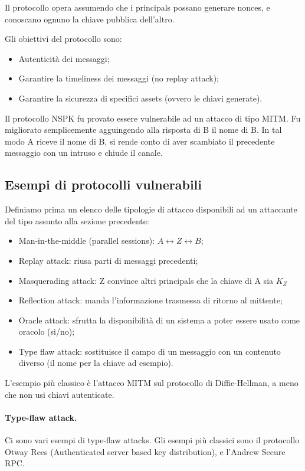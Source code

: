 \documentclass[a4paper, 10pt, twoside]{article}
\begin{document}
	Il protocollo opera assumendo che i principals possano generare nonces, e conoscano ognuno la chiave pubblica dell'altro.

	Gli obiettivi del protocollo sono:
	\begin{itemize}
		\item Autenticità dei messaggi;
		\item Garantire la timeliness dei messaggi (no replay attack);
		\item Garantire la sicurezza di specifici assets (ovvero le chiavi generate).
	\end{itemize}

	Il protocollo NSPK fu provato essere vulnerabile ad un attacco di tipo MITM. Fu migliorato semplicemente agguingendo alla risposta di B il nome di B. In tal modo A riceve il nome di B, si rende conto di aver scambiato il precedente messaggio con un intruso e chiude il canale.
	
	\subsection{Esempi di protocolli vulnerabili}
	Definiamo prima un elenco delle tipologie di attacco disponibili ad un attaccante del tipo assunto alla sezione precedente:
	\begin{itemize}
		\item Man-in-the-middle (parallel sessions): $A \leftrightarrow Z \leftrightarrow B$;
		\item Replay attack: riusa parti di messaggi precedenti;
		\item Masquerading attack: Z convince altri principals che la chiave di A sia $K_Z$
		\item Reflection attack: manda l'informazione trasmessa di ritorno al mittente;
		\item Oracle attack: sfrutta la disponibilità di un sistema a poter essere usato come oracolo (si/no);
		\item Type flaw attack: sostituisce il campo di un messaggio con un contenuto diverso (il nome per la chiave ad esempio).
	\end{itemize}
	
	L'esempio più classico è l'attacco MITM sul protocollo di Diffie-Hellman, a meno che non usi chiavi autenticate.

	\paragraph{Type-flaw attack.} Ci sono vari esempi di type-flaw attacks.
	Gli esempi più classici sono il protocollo Otway Rees (Authenticated server based key distribution), e l'Andrew Secure RPC.
\end{document}
